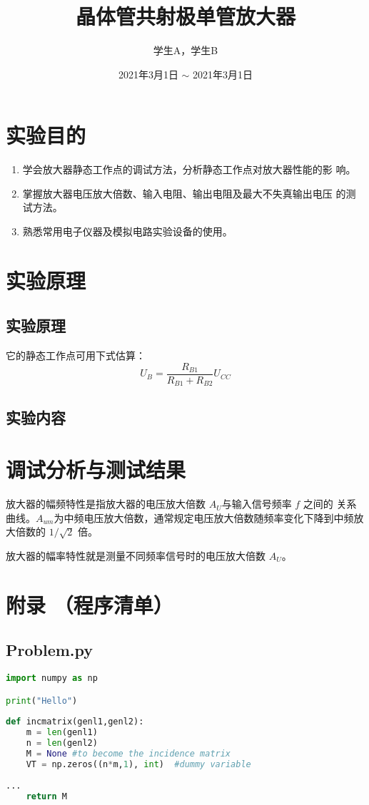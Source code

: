 \documentclass{ExpReport}
\author{学生A，学生B} %
\title{晶体管共射极单管放大器} %
\date{2021年3月1日 $\sim$ 2021年3月1日} %
\begin{document}
    \maketitle
    
    \section{实验目的}

    \begin{enumerate}
        \item 学会放大器静态工作点的调试方法，分析静态工作点对放大器性能的影
        响。
        \item 掌握放大器电压放大倍数、输入电阻、输出电阻及最大不失真输出电压
        的测试方法。
        \item 熟悉常用电子仪器及模拟电路实验设备的使用。
    \end{enumerate}

    \section{实验原理}

    \subsection{实验原理}
    它的静态工作点可用下式估算：
    $$
    U_B = \frac{R_{B1}}{R_{B1}+R_{B2}}U_{CC}
    $$

    \subsection{实验内容}

    \section{调试分析与测试结果}

    放大器的幅频特性是指放大器的电压放大倍数 $A_U$与输入信号频率 $f$ 之间的
关系曲线。$A_{um}$为中频电压放大倍数，通常规定电压放大倍数随频率变化下降到中频放大倍数的 $1/\sqrt{2}$ 倍。

    放大器的幅率特性就是测量不同频率信号时的电压放大倍数 $A_U$。
\newpage
\appendix
\section*{附录 （程序清单） }
\subsection{Problem.py}
\begin{lstlisting}[language=Python]
import numpy as np

print("Hello")
    
def incmatrix(genl1,genl2):
    m = len(genl1)
    n = len(genl2)
    M = None #to become the incidence matrix
    VT = np.zeros((n*m,1), int)  #dummy variable
    
...
    return M
\end{lstlisting}
\end{document}
